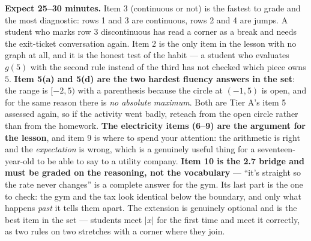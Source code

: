 \documentclass[10pt]{article}
\begin{document}
\boxguard[18]
\begin{teachernote}[Homework]
    \textbf{Expect 25--30 minutes.} Item 3 (continuous or not) is the fastest to grade and the most
    diagnostic: rows 1 and 3 are continuous, rows 2 and 4 are jumps. A student who marks row 3
    discontinuous has read a corner as a break and needs the exit-ticket conversation again. Item 2 is
    the only item in the lesson with no graph at all, and it is the honest test of the habit --- a
    student who evaluates $g(5)$ with the second rule instead of the third has not checked which piece
    owns $5$. \textbf{Item 5(a) and 5(d) are the two hardest fluency answers in the set}: the range is
    $[-2,5)$ with a parenthesis because the circle at $(-1,5)$ is open, and for the same reason there
    is \emph{no absolute maximum}. Both are Tier A's item 5 assessed again, so if the activity went
    badly, reteach from the open circle rather than from the homework. \textbf{The electricity items
    (6--9) are the argument for the lesson}, and item 9 is where to spend your attention: the
    arithmetic is right and the \emph{expectation} is wrong, which is a genuinely useful thing for a
    seventeen-year-old to be able to say to a utility company. \textbf{Item 10 is the 2.7 bridge and
    must be graded on the reasoning, not the vocabulary} --- ``it's straight so the rate never
    changes'' is a complete answer for the gym. Its last part is the one to check: the gym and the tax
    look identical below the boundary, and only what happens \emph{past} it tells them apart. The
    extension is genuinely optional and is the best item in the set --- students meet $|x|$ for the
    first time and meet it correctly, as two rules on two stretches with a corner where they join.
\end{teachernote}
\end{document}
